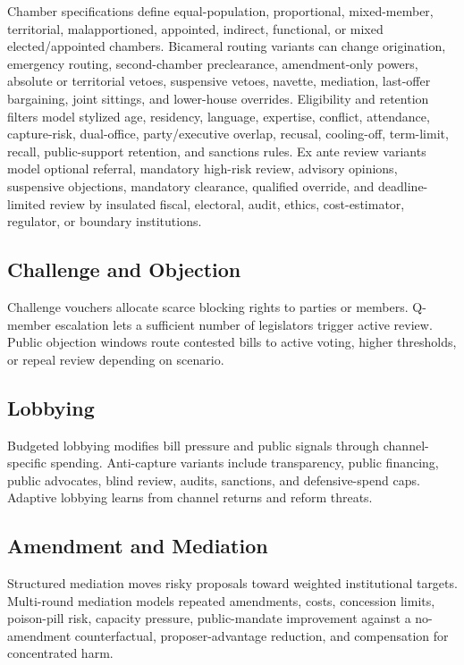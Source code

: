 \documentclass[manuscript,review,anonymous]{acmart}
\begin{document}
Chamber specifications define equal-population, proportional, mixed-member, territorial, malapportioned, appointed, indirect, functional, or mixed elected/appointed chambers. Bicameral routing variants can change origination, emergency routing, second-chamber preclearance, amendment-only powers, absolute or territorial vetoes, suspensive vetoes, navette, mediation, last-offer bargaining, joint sittings, and lower-house overrides. Eligibility and retention filters model stylized age, residency, language, expertise, conflict, attendance, capture-risk, dual-office, party/executive overlap, recusal, cooling-off, term-limit, recall, public-support retention, and sanctions rules. Ex ante review variants model optional referral, mandatory high-risk review, advisory opinions, suspensive objections, mandatory clearance, qualified override, and deadline-limited review by insulated fiscal, electoral, audit, ethics, cost-estimator, regulator, or boundary institutions.

\subsection{Challenge and Objection}

Challenge vouchers allocate scarce blocking rights to parties or members. Q-member escalation lets a sufficient number of legislators trigger active review. Public objection windows route contested bills to active voting, higher thresholds, or repeal review depending on scenario.

\subsection{Lobbying}

Budgeted lobbying modifies bill pressure and public signals through channel-specific spending. Anti-capture variants include transparency, public financing, public advocates, blind review, audits, sanctions, and defensive-spend caps. Adaptive lobbying learns from channel returns and reform threats.

\subsection{Amendment and Mediation}

Structured mediation moves risky proposals toward weighted institutional targets. Multi-round mediation models repeated amendments, costs, concession limits, poison-pill risk, capacity pressure, public-mandate improvement against a no-amendment counterfactual, proposer-advantage reduction, and compensation for concentrated harm.
\end{document}
